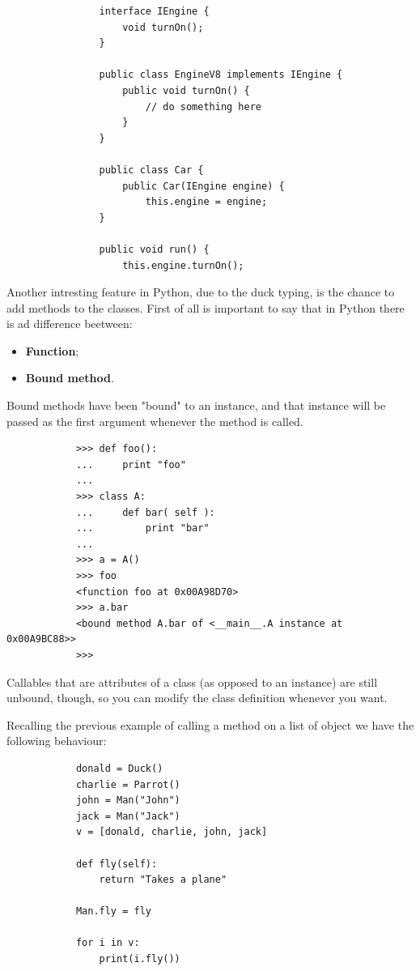 \documentclass[12pt]{article}
\begin{document}
			\begin{lstlisting}
				interface IEngine {
					void turnOn();
				}
				
				public class EngineV8 implements IEngine {
					public void turnOn() {
						// do something here
					}
				}
				
				public class Car {
					public Car(IEngine engine) {
						this.engine = engine;
				}
				
				public void run() {
					this.engine.turnOn();
			\end{lstlisting}
			
		Another intresting feature in Python, due to the duck typing, is the chance to add methods to the classes. First of all is important to say that in Python there is ad difference beetween:
		\begin{itemize}
			\item \textbf{Function};
			\item \textbf{Bound method}.
		\end{itemize} 
	
		Bound methods have been "bound" to an instance, and that instance will be passed as the first argument whenever the method is called.
		
		\begin{lstlisting}
			>>> def foo():
			...     print "foo"
			...
			>>> class A:
			...     def bar( self ):
			...         print "bar"
			...
			>>> a = A()
			>>> foo
			<function foo at 0x00A98D70>
			>>> a.bar
			<bound method A.bar of <__main__.A instance at 0x00A9BC88>>
			>>>
		\end{lstlisting}
		Callables that are attributes of a class (as opposed to an instance) are still unbound, though, so you can modify the class definition whenever you want.
		
			
		
		Recalling the previous example of calling a method on a list of object we have the following behaviour:
		
		\begin{lstlisting}
			donald = Duck()
			charlie = Parrot()
			john = Man("John")
			jack = Man("Jack")
			v = [donald, charlie, john, jack]
			
			def fly(self):
				return "Takes a plane"
			
			Man.fly = fly
			
			for i in v:
				print(i.fly())
		\end{lstlisting}
		
\end{document}
